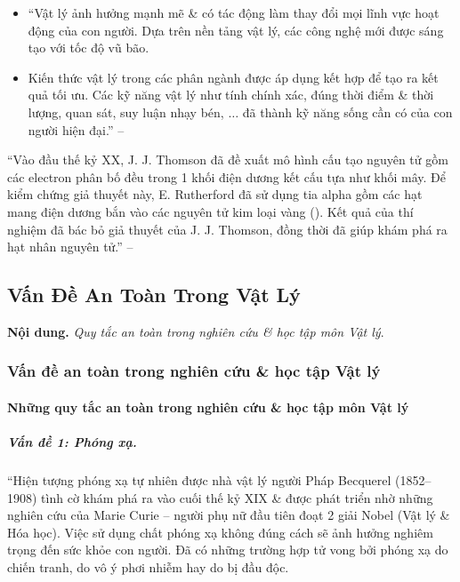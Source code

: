 \documentclass{article}
\numberwithin{equation}{section}
\begin{document}
\begin{itemize}
	\item ``Vật lý ảnh hưởng mạnh mẽ \& có tác động làm thay đổi mọi lĩnh vực hoạt động của con người. Dựa trên nền tảng vật lý, các công nghệ mới được sáng tạo với tốc độ vũ bão.
	\item Kiến thức vật lý trong các phân ngành được áp dụng kết hợp để tạo ra kết quả tối ưu. Các kỹ năng vật lý như tính chính xác, đúng thời điểm \& thời lượng, quan sát, suy luận nhạy bén, $\ldots$ đã thành kỹ năng sống cần có của con người hiện đại.'' -- \cite[p. 11]{SGK_Vat_Ly_10_Chan_Troi_Sang_Tao}
\end{itemize}
``Vào đầu thế kỷ XX, J. J. Thomson đã đề xuất mô hình cấu tạo nguyên tử gồm các electron phân bố đều trong 1 khối điện dương kết cấu tựa như khối mây. Để kiểm chứng giả thuyết này, E. Rutherford đã sử dụng tia alpha gồm các hạt mang điện dương bắn vào các nguyên tử kim loại vàng (\cite[Hình 1P.1: \textsf{Thí nghiệm Rutherford}, p. 11]{SGK_Vat_Ly_10_Chan_Troi_Sang_Tao}). Kết quả của thí nghiệm đã bác bỏ giả thuyết của J. J. Thomson, đồng thời đã giúp khám phá ra hạt nhân nguyên tử.'' -- \cite[p. 11]{SGK_Vat_Ly_10_Chan_Troi_Sang_Tao}


\subsection{Vấn Đề An Toàn Trong Vật Lý}
\textbf{Nội dung.} \textit{Quy tắc an toàn trong nghiên cứu \& học tập môn Vật lý}.

\subsubsection{Vấn đề an toàn trong nghiên cứu \& học tập Vật lý}

\paragraph{Những quy tắc an toàn trong nghiên cứu \& học tập môn Vật lý}

\subparagraph{Vấn đề 1: \textit{Phóng xạ}.} ``Hiện tượng phóng xạ tự nhiên được nhà vật lý người Pháp Becquerel (1852--1908) tình cờ khám phá ra vào cuối thế kỷ XIX \& được phát triển nhờ những nghiên cứu của Marie Curie -- người phụ nữ đầu tiên đoạt 2 giải Nobel (Vật lý \& Hóa học). Việc sử dụng chất phóng xạ không đúng cách sẽ ảnh hưởng nghiêm trọng đến sức khỏe con người. Đã có những trường hợp tử vong bởi phóng xạ do chiến tranh, do vô ý phơi nhiễm hay do bị đầu độc.
\end{document}

